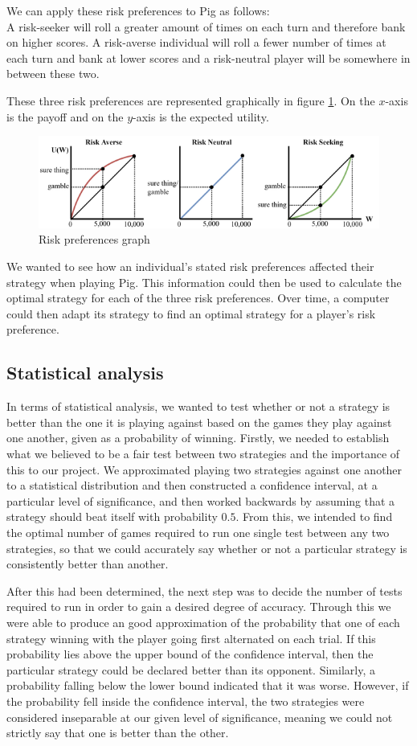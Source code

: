\documentclass[a4paper,titlepage]{article}
\begin{document}
We can apply these risk preferences to Pig as follows:\\A risk-seeker will roll a greater amount of times on each turn and therefore bank on higher scores. A risk-averse individual will roll a fewer number of times at each turn and bank at lower scores and a risk-neutral player will be somewhere in between these two.

These three risk preferences are represented graphically in figure \ref{figure4}. On the $x$-axis is the payoff and on the $y$-axis is the expected utility.
\begin{figure}
\includegraphics[width=\textwidth]{lottery-a-5}
\caption{Risk preferences graph\label{figure4}}
\end{figure}
We wanted to see how an individual’s stated risk preferences affected their strategy when playing Pig. This information could then be used to calculate the optimal strategy for each of the three risk preferences. Over time, a computer could then adapt its strategy to find an optimal strategy for a player’s risk preference.

\subsection{Statistical analysis}
In terms of statistical analysis, we wanted to test whether or not a strategy is better than the one it is playing against based on the games they play against one another, given as a probability of winning. Firstly, we needed to establish what we believed to be a fair test between two strategies and the importance of this to our project. We approximated playing two strategies against one another to a statistical distribution and then constructed a confidence interval, at a particular level of significance, and then worked backwards by assuming that a strategy should beat itself with probability $0.5$. From this, we intended to find the optimal number of games required to run one single test between any two strategies, so that we could accurately say whether or not a particular strategy is consistently better than another.

After this had been determined, the next step was to decide the number of tests required to run in order to gain a desired degree of accuracy. Through this we were able to produce an good approximation of the probability that one of each strategy winning with the player going first alternated on each trial. If this probability lies above the upper bound of the confidence interval, then the particular strategy could be declared better than its opponent. Similarly, a probability falling below the lower bound indicated that it was worse. However, if the probability fell inside the confidence interval, the two strategies were considered inseparable at our given level of significance, meaning we could not strictly say that one is better than the other.
\end{document}
